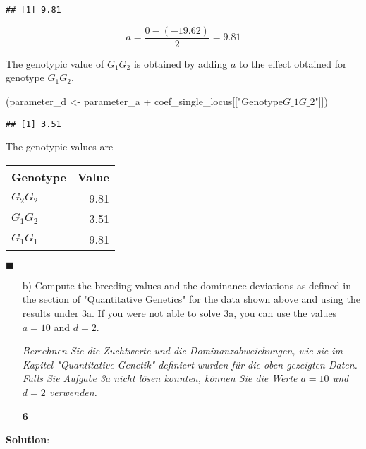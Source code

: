 \documentclass[
]{article}
\newenvironment{Shaded}{\begin{snugshade}}{\end{snugshade}}
\newcommand{\NormalTok}[1]{#1}
\newcommand{\OtherTok}[1]{\textcolor[rgb]{0.56,0.35,0.01}{#1}}
\newcommand{\SpecialCharTok}[1]{\textcolor[rgb]{0.00,0.00,0.00}{#1}}
\newcommand{\StringTok}[1]{\textcolor[rgb]{0.31,0.60,0.02}{#1}}
\newcommand{\points}[1]
{\begin{flushright}\textbf{#1}\end{flushright}}
\newcommand{\solstart}
{\vspace{3ex}\textbf{Solution}:}
\newcommand{\solend}
{\vspace{2ex}$\blacksquare$}
\begin{document}
\begin{verbatim}
## [1] 9.81
\end{verbatim}

\[a = \frac{0 - (-19.62)}{2} = 9.81\]

The genotypic value of \(G_1G_2\) is obtained by adding \(a\) to the
effect obtained for genotype \(G_1G_2\).

\begin{Shaded}
\begin{Highlighting}[]
\NormalTok{(parameter\_d }\OtherTok{\textless{}{-}}\NormalTok{ parameter\_a }\SpecialCharTok{+}\NormalTok{ coef\_single\_locus[[}\StringTok{"Genotype$G\_1G\_2$"}\NormalTok{]])}
\end{Highlighting}
\end{Shaded}

\begin{verbatim}
## [1] 3.51
\end{verbatim}

The genotypic values are

\begin{tabular}{lr}
\toprule
Genotype & Value\\
\midrule
$G_2G_2$ & -9.81\\
$G_1G_2$ & 3.51\\
$G_1G_1$ & 9.81\\
\bottomrule
\end{tabular}

\solend

\clearpage
\pagebreak

\begin{enumerate}
\item[b)] Compute the breeding values and the dominance deviations as defined in the section of "Quantitative Genetics" for the data shown above and using the results under 3a. If you were not able to solve 3a, you can use the values $a = 10$ and $d = 2$. 

\textit{ Berechnen Sie die Zuchtwerte und die Dominanzabweichungen, wie sie im Kapitel "Quantitative Genetik" definiert wurden für die oben gezeigten Daten. Falls Sie Aufgabe 3a nicht lösen konnten, können Sie die Werte $a=10$ und $d = 2$ verwenden.}
\points{6}
\end{enumerate}

\solstart
\end{document}
